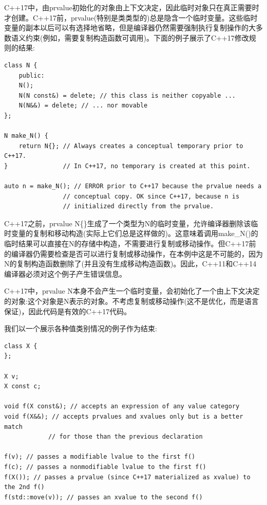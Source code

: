 C++17中，由prvalue初始化的对象由上下文决定，因此临时对象只在真正需要时才创建。C++17前，prvalue(特别是类类型的)总是隐含一个临时变量。这些临时变量的副本以后可以有选择地省略，但是编译器仍然需要强制执行复制操作的大多数语义约束(例如，需要复制构造函数可调用)。下面的例子展示了C++17修改规则的结果:

\begin{lstlisting}[style=styleCXX]
class N {
	public:
	N();
	N(N const&) = delete; // this class is neither copyable ...
	N(N&&) = delete; // ... nor movable
};

N make_N() {
	return N{}; // Always creates a conceptual temporary prior to C++17.
} 				// In C++17, no temporary is created at this point.

auto n = make_N(); // ERROR prior to C++17 because the prvalue needs a
				// conceptual copy. OK since C++17, because n is
				// initialized directly from the prvalue.
\end{lstlisting}

C++17之前，prvalue N\{\}生成了一个类型为N的临时变量，允许编译器删除该临时变量的复制和移动构造(实际上它们总是这样做的)。这意味着调用make\_N()的临时结果可以直接在N的存储中构造，不需要进行复制或移动操作。但C++17前的编译器仍需要检查是否可以进行复制或移动操作，在本例中这是不可能的，因为N的复制构造函数删除了(并且没有生成移动构造函数)。因此，C++11和C++14编译器必须对这个例子产生错误信息。

C++17中，prvalue N本身不会产生一个临时变量，会初始化了一个由上下文决定的对象:这个对象是N表示的对象。不考虑复制或移动操作(这不是优化，而是语言保证)，因此代码是有效的C++17代码。

我们以一个展示各种值类别情况的例子作为结束:

\begin{lstlisting}[style=styleCXX]
class X {
};

X v;
X const c;

void f(X const&); // accepts an expression of any value category
void f(X&&); // accepts prvalues and xvalues only but is a better match
			// for those than the previous declaration

f(v); // passes a modifiable lvalue to the first f()
f(c); // passes a nonmodifiable lvalue to the first f()
f(X()); // passes a prvalue (since C++17 materialized as xvalue) to the 2nd f()
f(std::move(v)); // passes an xvalue to the second f()
\end{lstlisting}









